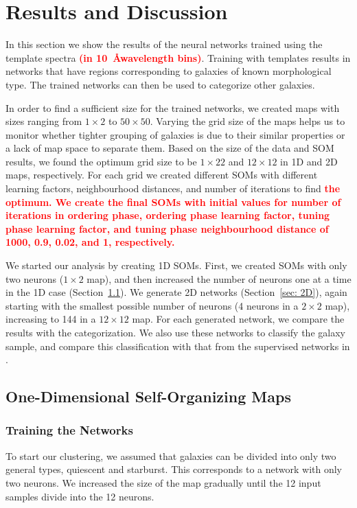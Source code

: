 \section{Results and Discussion}
\label{sec: result}

    In this section we show the results of the neural networks trained using the  template spectra \textbf{\textcolor{red}{(in 10~\AA wavelength bins)}}.
    Training with  templates results in networks that have regions corresponding to galaxies of known morphological type. 
    The trained networks can then be used to categorize other galaxies.

    In order to find a sufficient size for the trained networks, we created maps with sizes ranging from $1\times2$ to $50\times50$.
    Varying the grid size of the maps helps us to monitor whether tighter grouping of galaxies is due to their similar properties or a lack of map space to separate them.
    Based on the size of the data and SOM results, we found the optimum grid size to be $1\times22$ and $12\times12$ in 1D and 2D maps, respectively. 
    For each grid we created different SOMs with different learning factors, neighbourhood distances, and number of iterations to find \textbf{\textcolor{red}{the optimum.
    We create the final SOMs with initial values for number of iterations in ordering phase, ordering phase learning factor, tuning phase learning factor, and tuning phase neighbourhood distance of 1000, 0.9, 0.02, and 1, respectively.}}
   
    We started our analysis by creating 1D SOMs. 
    First, we created SOMs with only two neurons ($1\times2$ map), and then increased the number of neurons one at a time in the 1D case (Section~\ref{sec: 1D_somz}).
    We generate 2D networks (Section~\ref{sec: 2D}),  again starting with the smallest possible number of neurons (4 neurons in a $2\times2$ map), increasing to 144 in a $12\times12$ map.    
    For each generated network, we compare the results with the  categorization.
    We also use these networks to classify the  galaxy sample, and compare this classification with that from the supervised networks in .

    \subsection{One-Dimensional Self-Organizing Maps}
    \label{sec: 1D_somz}
        \subsubsection{Training the Networks}
        \label{sec: 1Dt}
            To start our clustering, we assumed that galaxies can be divided into only two general types, quiescent and starburst.
            This corresponds to a network with only two neurons.
            We increased the size of the map gradually until the 12 input samples divide into the 12 neurons. 
        
